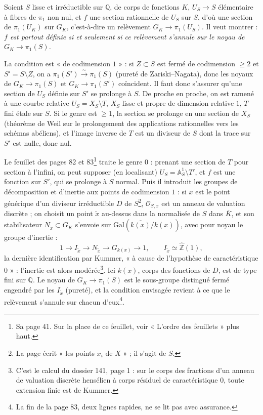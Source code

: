 \documentclass[11pt,a4paper]{article}
\begin{document}
Soient $S$ lisse et irréductible sur $\mathbb{Q}$, de corps de fonctions $K$,
$U_S \to S$ élémentaire à fibres de $\pi_1$ non nul, et $f$ une section
rationnelle de $U_S$ sur $S$, d'où une section de $\pi_1(U_K)$ sur $G_K$,
c'est-à-dire un relèvement $G_K \to \pi_1(U_S)$. Il veut montrer : \emph{$f$
est partout définie si et seulement si ce relèvement s'annule sur le noyau de
$G_K \to \pi_1(S)$.}

La condition est « de codimension $1$ » : si $Z \subset S$ est fermé de
codimension $\ge 2$ et $S' = S \setminus Z$, on a $\pi_1(S')
\xrightarrow{\sim} \pi_1(S)$ (pureté de Zariski–Nagata), donc les noyaux de
$G_K \to \pi_1(S)$ et $G_K \to \pi_1(S')$ coïncident. Il faut donc s'assurer
qu'une section de $U_S$ définie sur $S'$ se prolonge à $S$. De proche en
proche, on est ramené à une courbe relative $U_S = X_S \setminus T$, $X_S$
lisse et propre de dimension relative $1$, $T$ fini étale sur $S$. Si le
genre est $\ge 1$, la section se prolonge en une section de $X_S$ (théorème de
Weil sur le prolongement des applications rationnelles vers les schémas
abéliens), et l'image inverse de $T$ est un diviseur de $S$ dont la trace sur
$S'$ est nulle, donc nul.

Le feuillet des pages 82 et 83\footnote{Sa page 41. Sur la place de ce
feuillet, voir « L'ordre des feuillets » plus haut.} traite le genre $0$ :
prenant une section de $T$ pour section à l'infini, on peut supposer (en
localisant) $U_S = \mathbb{A}^1_S \setminus T'$, et $f$ est une fonction sur
$S'$, qui se prolonge à $S$ normal. Puis il introduit les groupes de
décomposition et d'inertie aux points de codimension $1$ : si $x$ est le
point générique d'un diviseur irréductible $D$ de $S$\footnote{La page écrit
« les points $x_i$ de $X$ » ; il s'agit de $S$.}, $\mathcal{O}_{S,x}$ est un
anneau de valuation discrète ; on choisit un point $\tilde x$ au-dessus dans la
normalisée de $S$ dans $\overline{K}$, et son stabilisateur $N_{\tilde x}
\subset G_K$ s'envoie sur $\mathrm{Gal}(\overline{k(x)}/k(x))$, avec pour noyau
le groupe d'inertie :
\[
1 \longrightarrow I_{\tilde x} \longrightarrow N_{\tilde x} \longrightarrow
G_{k(x)} \longrightarrow 1, \qquad I_{\tilde x} \simeq
\widehat{\mathbb{Z}}(1),
\]
la dernière identification par Kummer, « à cause de l'hypothèse de
caractéristique $0$ » : l'inertie est alors modérée\footnote{C'est le calcul du
dossier 141, page 1 : sur le corps des fractions d'un anneau de valuation
discrète hensélien à corps résiduel de caractéristique $0$, toute extension
finie est de Kummer.}. Ici $k(x)$, corps des fonctions de $D$, est de type fini
sur $\mathbb{Q}$. Le noyau de $G_K \to \pi_1(S)$ est le sous-groupe distingué
fermé engendré par les $I_{\tilde x}$ (pureté), et la condition envisagée
revient à ce que le relèvement s'annule sur chacun d'eux\footnote{La fin de la
page 83, deux lignes rapides, ne se lit pas avec assurance.}.
\end{document}
